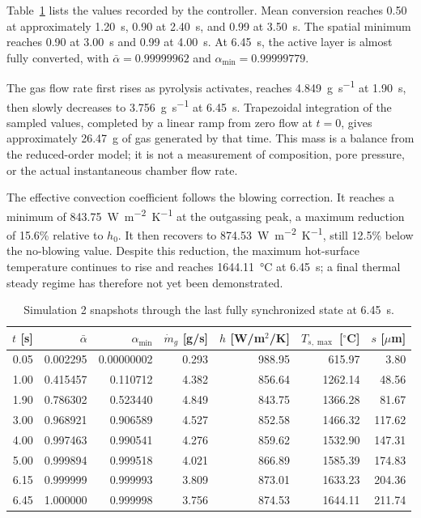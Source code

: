 \documentclass[oneside,openany]{amsdtx}
\begin{document}
Table~\ref{tab:sim2-results-snapshot} lists the values recorded by the
controller. Mean conversion reaches 0.50 at approximately \SI{1.20}{s}, 0.90
at \SI{2.40}{s}, and 0.99 at \SI{3.50}{s}. The spatial minimum reaches 0.90 at
\SI{3.00}{s} and 0.99 at \SI{4.00}{s}. At \SI{6.45}{s}, the active layer is
almost fully converted, with \(\bar\alpha=0.99999962\) and
\(\alpha_\mathrm{min}=0.99999779\).

The gas flow rate first rises as pyrolysis activates, reaches
\SI{4.849}{g.s^{-1}} at \SI{1.90}{s}, then slowly decreases to
\SI{3.756}{g.s^{-1}} at \SI{6.45}{s}. Trapezoidal integration of the sampled
values, completed by a linear ramp from zero flow at \(t=0\), gives
approximately \SI{26.47}{g} of gas generated by that time. This
mass is a balance from the reduced-order model; it is not a measurement of
composition, pore pressure, or the actual instantaneous chamber flow rate.

The effective convection coefficient follows the blowing correction. It
reaches a minimum of \SI{843.75}{W.m^{-2}.K^{-1}} at the outgassing peak, a
maximum reduction of 15.6\% relative to \(h_0\). It then recovers to
\SI{874.53}{W.m^{-2}.K^{-1}}, still 12.5\% below the no-blowing value. Despite
this reduction, the maximum hot-surface temperature continues to rise and
reaches \SI{1644.11}{\celsius} at \SI{6.45}{s}; a final thermal steady regime
has therefore not yet been demonstrated.

\begin{table}[H]
\centering
\scriptsize
\renewcommand{\arraystretch}{1.16}
\begin{tabular}{rrrrrrr}
\toprule
\(t\) [s] & \(\bar\alpha\) & \(\alpha_\mathrm{min}\) &
\(\dot m_g\) [g/s] & \(h\) [W/m$^2$/K] &
\(T_{s,\max}\) [$^\circ$C] & \(s\) [$\mu$m] \\
\midrule
0.05 & 0.002295 & 0.00000002 & 0.293 & 988.95 & 615.97 & 3.80 \\
1.00 & 0.415457 & 0.110712 & 4.382 & 856.64 & 1262.14 & 48.56 \\
1.90 & 0.786302 & 0.523440 & 4.849 & 843.75 & 1366.28 & 81.67 \\
3.00 & 0.968921 & 0.906589 & 4.527 & 852.58 & 1466.32 & 117.62 \\
4.00 & 0.997463 & 0.990541 & 4.276 & 859.62 & 1532.90 & 147.31 \\
5.00 & 0.999894 & 0.999518 & 4.021 & 866.89 & 1585.39 & 174.83 \\
6.15 & 0.999999 & 0.999993 & 3.809 & 873.01 & 1633.23 & 204.36 \\
6.45 & 1.000000 & 0.999998 & 3.756 & 874.53 & 1644.11 & 211.74 \\
\bottomrule
\end{tabular}
\caption{Simulation 2 snapshots through the last fully synchronized state at
\SI{6.45}{s}.}
\label{tab:sim2-results-snapshot}
\end{table}
\end{document}
